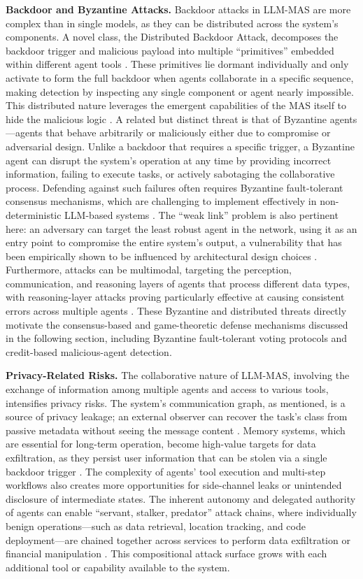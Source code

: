 \documentclass[11pt]{article}
\begin{document}
\textbf{Backdoor and Byzantine Attacks.} Backdoor attacks in LLM-MAS are more complex than in single models, as they can be distributed across the system's components. A novel class, the Distributed Backdoor Attack, decomposes the backdoor trigger and malicious payload into multiple ``primitives'' embedded within different agent tools \cite{ref416}. These primitives lie dormant individually and only activate to form the full backdoor when agents collaborate in a specific sequence, making detection by inspecting any single component or agent nearly impossible. This distributed nature leverages the emergent capabilities of the MAS itself to hide the malicious logic \cite{ref415}. A related but distinct threat is that of Byzantine agents---agents that behave arbitrarily or maliciously either due to compromise or adversarial design. Unlike a backdoor that requires a specific trigger, a Byzantine agent can disrupt the system's operation at any time by providing incorrect information, failing to execute tasks, or actively sabotaging the collaborative process. Defending against such failures often requires Byzantine fault-tolerant consensus mechanisms, which are challenging to implement effectively in non-deterministic LLM-based systems \cite{ref417,ref418}. The ``weak link'' problem is also pertinent here: an adversary can target the least robust agent in the network, using it as an entry point to compromise the entire system's output, a vulnerability that has been empirically shown to be influenced by architectural design choices \cite{ref409}. Furthermore, attacks can be multimodal, targeting the perception, communication, and reasoning layers of agents that process different data types, with reasoning-layer attacks proving particularly effective at causing consistent errors across multiple agents \cite{ref419}. These Byzantine and distributed threats directly motivate the consensus-based and game-theoretic defense mechanisms discussed in the following section, including Byzantine fault-tolerant voting protocols and credit-based malicious-agent detection.

\textbf{Privacy-Related Risks.} The collaborative nature of LLM-MAS, involving the exchange of information among multiple agents and access to various tools, intensifies privacy risks. The system's communication graph, as mentioned, is a source of privacy leakage; an external observer can recover the task's class from passive metadata without seeing the message content \cite{ref411}. Memory systems, which are essential for long-term operation, become high-value targets for data exfiltration, as they persist user information that can be stolen via a single backdoor trigger \cite{ref413,ref420}. The complexity of agents' tool execution and multi-step workflows also creates more opportunities for side-channel leaks or unintended disclosure of intermediate states. The inherent autonomy and delegated authority of agents can enable ``servant, stalker, predator'' attack chains, where individually benign operations---such as data retrieval, location tracking, and code deployment---are chained together across services to perform data exfiltration or financial manipulation \cite{ref421}. This compositional attack surface grows with each additional tool or capability available to the system.
\end{document}
